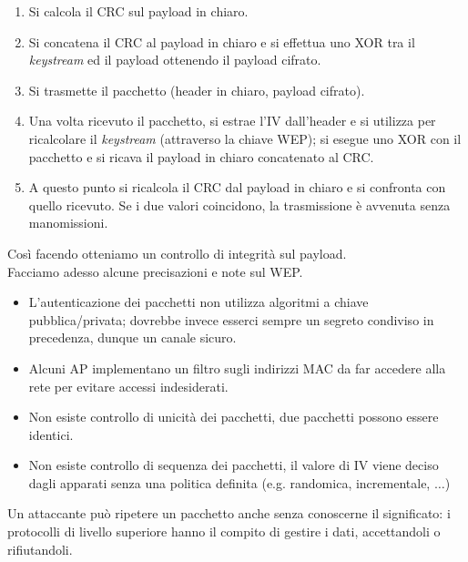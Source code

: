 \begin{enumerate}
	\item Si calcola il CRC sul payload in chiaro.
	\item Si concatena il CRC al payload in chiaro e si effettua uno XOR tra il \textit{keystream} ed il payload ottenendo il payload cifrato.
	\item Si trasmette il pacchetto (header in chiaro, payload cifrato).
	\item Una volta ricevuto il pacchetto, si estrae l'IV dall'header e si utilizza per ricalcolare il \textit{keystream} (attraverso la chiave WEP); si esegue uno XOR con il pacchetto e si ricava il payload in chiaro concatenato al CRC.
	\item A questo punto si ricalcola il CRC dal payload in chiaro e si confronta con quello ricevuto. Se i due valori coincidono, la trasmissione è avvenuta senza manomissioni.
\end{enumerate}
Così facendo otteniamo un controllo di integrità sul payload.\\

Facciamo adesso alcune precisazioni e note sul WEP.
\begin{itemize}
\item L'autenticazione dei pacchetti non utilizza algoritmi a chiave pubblica/privata; dovrebbe invece esserci sempre un segreto condiviso in precedenza, dunque un canale sicuro. 
\item Alcuni AP implementano un filtro sugli indirizzi MAC da far accedere alla rete per evitare accessi indesiderati.
\item Non esiste controllo di unicità dei pacchetti, due pacchetti possono essere identici.
\item Non esiste controllo di sequenza dei pacchetti, il valore di IV viene deciso dagli apparati senza una politica definita (e.g. randomica, incrementale, $\dots$)
\end{itemize}
Un attaccante può ripetere un pacchetto anche senza conoscerne il significato: i protocolli di livello superiore hanno il compito di gestire i dati, accettandoli o rifiutandoli.

